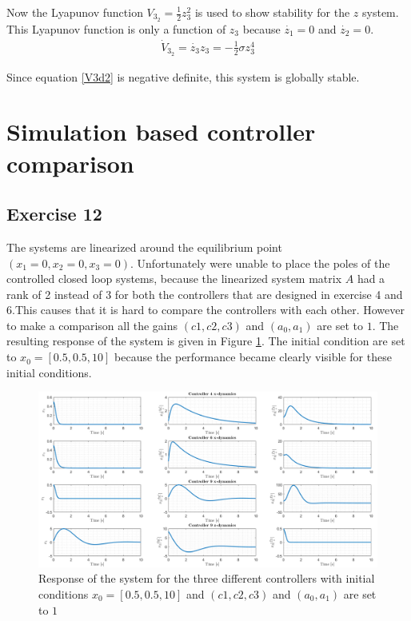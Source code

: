 \documentclass[a4paper,12pt]{article}
\begin{document}
Now the Lyapunov function $V_{3_2}=\frac{1}{2}z_3^2$ is used to show stability for the $z$ system. This Lyapunov function is only a function of $z_3$ because $\dot{z_1}=0$ and $\dot{z_2}=0$. 
\begin{align}
\dot{V}_{3_2}=\dot{z_3}z_3=-\frac{1}{2}\sigma z_3^4
\label{V3d2}
\end{align}

Since equation \ref{V3d2} is negative definite, this system is globally stable. 

\section{Simulation based controller comparison}
\subsection{Exercise 12}
The systems are linearized around the equilibrium point $(x_1=0,x_2=0,x_3=0)$. Unfortunately were unable to place the poles of the controlled closed loop systems, because the linearized system matrix $A$ had a rank of 2 instead of 3 for both the controllers that are designed in exercise 4 and 6.This causes that it is hard to compare the controllers with each other. However to make a comparison all the gains $(c1,c2,c3)$ and $(a_0,a_1)$ are set to $1$. The resulting response of the system is given in Figure \ref{fig:controllers1}. The initial condition are set to $x_0 = [0.5, 0.5, 10]$ because the performance became clearly visible for these initial conditions.

\begin{figure}[H]
\begin{center}
\includegraphics[width= \textwidth]{Figures/controllers.png}
\caption{Response of the system for the three different controllers with initial conditions $x_0 = [0.5, 0.5, 10]$ and $(c1,c2,c3)$ and $(a_0,a_1)$ are set to $1$}
\label{fig:controllers1}
\end{center}
\end{figure}
\end{document}
